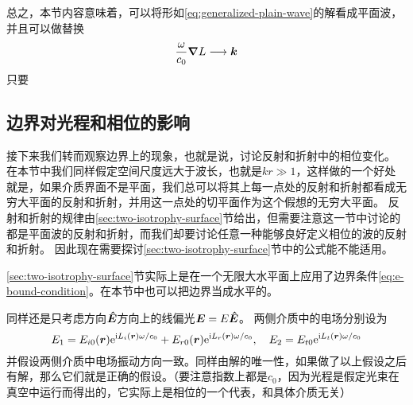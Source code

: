 总之，本节内容意味着，可以将形如\eqref{eq:generalized-plain-wave}的解看成平面波，并且可以做替换
\begin{equation}
    \frac{\omega}{c_0} \grad{L} \longrightarrow \vb*{k}
    \label{eq:generalized-k}
\end{equation}
只要

\subsection{边界对光程和相位的影响}

接下来我们转而观察边界上的现象，也就是说，讨论反射和折射中的相位变化。
在本节中我们同样假定空间尺度远大于波长，也就是$kr \gg 1$，这样做的一个好处就是，如果介质界面不是平面，我们总可以将其上每一点处的反射和折射都看成无穷大平面的反射和折射，并用这一点处的切平面作为这个假想的无穷大平面。
反射和折射的规律由\ref{sec:two-isotrophy-surface}节给出，但需要注意这一节中讨论的都是平面波的反射和折射，而我们却要讨论任意一种能够良好定义相位的波的反射和折射。
因此现在需要探讨\ref{sec:two-isotrophy-surface}节中的公式能不能适用。

\ref{sec:two-isotrophy-surface}节实际上是在一个无限大水平面上应用了边界条件\eqref{eq:e-bound-condition}。在本节中也可以把边界当成水平的。

同样还是只考虑方向$\vu*{E}$方向上的线偏光$\vb*{E} = E \vu*{E}$。
两侧介质中的电场分别设为
\[
    E_1 = E_{i0}(\vb*{r}) \mathrm{e}^{\mathrm{i} L_i(\vb*{r}) \omega / c_0} + E_{r0}(\vb*{r}) \mathrm{e}^{\mathrm{i} L_r(\vb*{r}) \omega / c_0}, \quad E_2 = E_{t0} \mathrm{e}^{\mathrm{i} L_t(\vb*{r}) \omega / c_0}
\]
并假设两侧介质中电场振动方向一致。同样由解的唯一性，如果做了以上假设之后有解，那么它们就是正确的假设。（要注意指数上都是$c_0$，因为光程是假定光束在真空中运行而得出的，它实际上是相位的一个代表，和具体介质无关）

